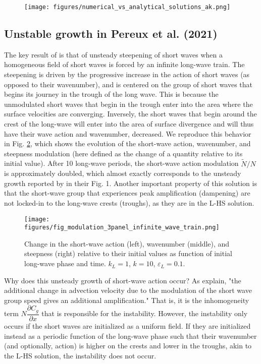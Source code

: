 \documentclass[lineno]{jfm}
\begin{document}
\begin{figure}
\centering
\texttt{[image: figures/numerical\_vs\_analytical\_solutions\_ak.png]}
\caption{}
\label{fig:numerical_vs_analytical_ak}
\end{figure}

\subsection{Unstable growth in Pereux et al. (2021)}
\label{subsection:unstable_growth}

The key result of \citet{peureux2021unsteady} is that of unsteady steepening of
short waves when a homogeneous field of short waves is forced by an infinite
long-wave train.
The steepening is driven by the progressive increase in the action of short
waves (as opposed to their wavenumber), and is centered on the group of short
waves that begins its journey in the trough of the long wave.
This is because the unmodulated short waves that begin in the trough enter into
the area where the surface velocities are converging.
Inversely, the short waves that begin around the crest of the long-wave will
enter into the area of surface divergence and will thus have their wave action
and wavenumber, decreased.
We reproduce this behavior in Fig. \ref{fig:modulation_3panel_infinite}, which
shows the evolution of the short-wave action, wavenumber, and steepness
modulation (here defined as the change of a quantity relative to its initial value).
After 10 long-wave periods, the short-wave action modulation $\widetilde{N}/N$
is approximately doubled, which almost exactly corresponds to the unsteady growth
reported by \citet{peureux2021unsteady} in their Fig. 1.
Another important property of this solution is that the short-wave group that
experiences peak amplification (dampening) are not locked-in to the long-wave
crests (troughs), as they are in the L-HS solution.

\begin{figure}
\centering
\texttt{[image: figures/fig\_modulation\_3panel\_infinite\_wave\_train.png]}
\caption{
  Change in the short-wave action (left), wavenumber (middle), and steepness (right)
  relative to their initial values as function of initial long-wave phase and time.
  $k_L = 1$, $k = 10$, $\varepsilon_L = 0.1$.
}
\label{fig:modulation_3panel_infinite}
\end{figure}

Why does this unsteady growth of short-wave action occur?
As \citet{peureux2021unsteady} explain, "the additional change in advection
velocity due to the modulation of the short wave group speed gives an additional
amplification."
That is, it is the inhomogeneity term $N \dfrac{\partial C_g}{\partial x}$ that
is responsible for the instability.
However, the instability only occurs if the short waves are initialized as a
uniform field.
If they are initialized instead as a periodic function of the long-wave phase
such that their wavenumber (and optionally, action) is higher on the crests
and lower in the troughs, akin to the L-HS solution, the instability does not
occur.
\end{document}
